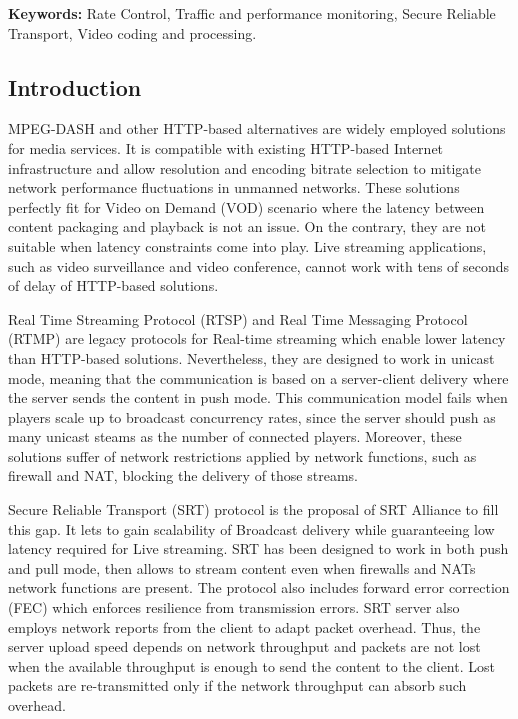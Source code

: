 \textbf{Keywords:} Rate Control, Traffic and performance monitoring, Secure Reliable Transport, Video coding and processing.

\subsection{Introduction}
MPEG-DASH \cite{sodagar2011mpeg} and other HTTP-based alternatives are widely employed solutions for media services. It is compatible with existing HTTP-based Internet infrastructure and allow resolution and encoding bitrate selection to mitigate network performance fluctuations in unmanned networks. These solutions perfectly fit for Video on Demand (VOD) scenario where the latency between content packaging and playback is not an issue. On the contrary, they are not suitable when latency constraints come into play. Live streaming applications, such as video surveillance and video conference, cannot work with tens of seconds of delay of HTTP-based solutions.

Real Time Streaming Protocol (RTSP) and Real Time Messaging Protocol (RTMP) are legacy protocols for Real-time streaming which enable lower latency than HTTP-based solutions. Nevertheless, they are designed to work in unicast mode, meaning that the communication is based on a server-client delivery where the server sends the content in push mode. This communication model fails when players scale up to broadcast concurrency rates, since the server should push as many unicast steams as the number of connected players. Moreover, these solutions suffer of network restrictions applied by network functions, such as firewall and NAT, blocking the delivery of those streams.

Secure Reliable Transport (SRT) protocol \cite{srt2018} is the proposal of SRT Alliance to fill this gap. It lets to gain scalability of Broadcast delivery while guaranteeing low latency required for Live streaming. SRT has been designed to work in both push and pull mode, then allows to stream content even when firewalls and NATs network functions are present. The protocol also includes forward error correction (FEC) \cite{luby2002} which enforces resilience from transmission errors. SRT server also employs network reports from the client to adapt packet overhead. Thus, the server upload speed depends on network throughput and packets are not lost when the available throughput is enough to send the content to the client. Lost packets are re-transmitted only if the network throughput can absorb such overhead.

